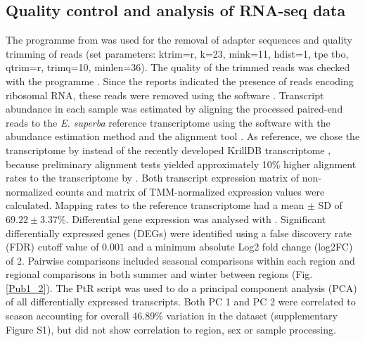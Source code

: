 \subsection{Quality control and analysis of RNA-seq data}

The programme  from 
\citep{bushnell_bbmap._2016} was used for the removal of adapter sequences and
quality trimming of reads (set parameters: ktrim=r, k=23, mink=11, hdist=1, tpe
tbo, qtrim=r, trimq=10, minlen=36). The quality of the trimmed reads was
checked with the programme  \citep{andrews_fastqc:_2017}.
Since the  reports indicated the presence of reads encoding
ribosomal RNA, these reads were removed using the software  \citep{kopylova_sortmerna:_2012}.  Transcript abundance in each sample
was estimated by aligning the processed paired-end reads to the \textit{E.
superba} reference transcriptome \citep{meyer_pyrosequencing_2015} using the
software  \citep{grabherr_full-length_2011} with the
abundance estimation method  \citep{li_rsem:_2011} and the
alignment tool  \citep{langmead_fast_2012}. As reference,
we chose the transcriptome by \citet{meyer_pyrosequencing_2015} instead of the
recently developed KrillDB transcriptome \citep{sales_krilldb:_2017}, because
preliminary alignment tests yielded approximately 10\% higher alignment rates
to the transcriptome by \citet{meyer_pyrosequencing_2015}. Both transcript
expression matrix of non-normalized counts and matrix of TMM-normalized
expression values were calculated. Mapping rates to the reference transcriptome
had a mean $\pm$ SD of $69.22 \pm 3.37$\%. Differential gene expression was
analysed with  \citep{robinson_edger:_2010}. Significant
differentially expressed genes (DEGs) were identified using a false discovery
rate (FDR) cutoff value of $0.001$ and a minimum absolute Log2 fold change
(log2FC) of 2. Pairwise comparisons included seasonal comparisons within each
region and regional comparisons in both summer and winter between regions (Fig.
\ref{Pub1_2}). The PtR script was used to do a principal component analysis
(PCA) of all differentially expressed transcripts.  Both PC 1 and PC 2 were
correlated to season accounting for overall 46.89\% variation in the dataset
(supplementary Figure S1), but did not show correlation to region, sex or
sample processing.


